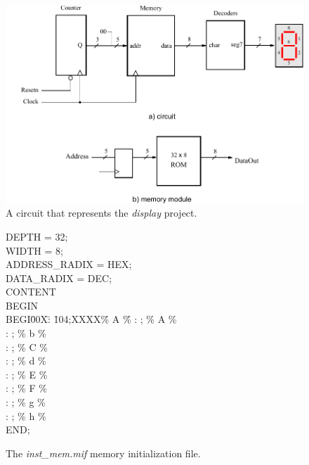 
\begin{figure}[t]
	\begin{center}
		\includegraphics[scale = 1.0]{figures/figdisplay.pdf}
	\end{center}
          \caption{A circuit that represents the {\it display} project.}
	\label{fig:memory}
\end{figure}

\begin{figure}[bh!]
\begin{center}
\begin{minipage}[t]{12.5 cm}
\begin{tabbing}
DEPTH = 32;\\
WIDTH = 8;\\
ADDRESS\_RADIX = HEX;\\
DATA\_RADIX = DEC;\\
CONTENT\\
BEGIN\\
BEGI\=00X\=: \=104;XXXX\=\% A \=\% \kill
{} \>: ;    \>\% A \>\%\\
 \>: ;    \>\% b \>\%\\
 \>: ;    \>\% C \>\%\\
 \>: ;   \>\% d \>\%\\
 \>: ;    \>\% E \>\%\\
 \>: ;    \>\% F \>\%\\
 \>: ;   \>\% g \>\%\\
 \>: ;   \>\% h \>\%\\
END;
\end{tabbing}
\end{minipage}
\end{center}
    \caption{The {\it inst\_mem.mif} memory initialization file.}
\label{fig:mif}
\end{figure}

